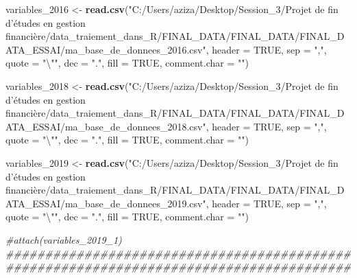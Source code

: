 \documentclass[
]{article}
\newenvironment{Shaded}{\begin{snugshade}}{\end{snugshade}}
\newcommand{\CharTok}[1]{\textcolor[rgb]{0.31,0.60,0.02}{#1}}
\newcommand{\CommentTok}[1]{\textcolor[rgb]{0.56,0.35,0.01}{\textit{#1}}}
\newcommand{\DataTypeTok}[1]{\textcolor[rgb]{0.13,0.29,0.53}{#1}}
\newcommand{\DecValTok}[1]{\textcolor[rgb]{0.00,0.00,0.81}{#1}}
\newcommand{\KeywordTok}[1]{\textcolor[rgb]{0.13,0.29,0.53}{\textbf{#1}}}
\newcommand{\NormalTok}[1]{#1}
\newcommand{\OtherTok}[1]{\textcolor[rgb]{0.56,0.35,0.01}{#1}}
\newcommand{\StringTok}[1]{\textcolor[rgb]{0.31,0.60,0.02}{#1}}
\begin{document}
\begin{Shaded}
\begin{Highlighting}[]
\NormalTok{variables_}\DecValTok{2016}\NormalTok{ <-}\StringTok{ }\KeywordTok{read.csv}\NormalTok{(}\StringTok{"C:/Users/aziza/Desktop/Session_3/Projet de fin d'études en gestion financière/data_traiement_dans_R/FINAL_DATA/FINAL_DATA/FINAL_DATA_ESSAI/ma_base_de_donnees_2016.csv"}\NormalTok{, }
                           \DataTypeTok{header =} \OtherTok{TRUE}\NormalTok{, }\DataTypeTok{sep =} \StringTok{","}\NormalTok{, }\DataTypeTok{quote =} \StringTok{"}\CharTok{\textbackslash{}"}\StringTok{"}\NormalTok{,}
                           \DataTypeTok{dec =} \StringTok{"."}\NormalTok{, }\DataTypeTok{fill =} \OtherTok{TRUE}\NormalTok{, }\DataTypeTok{comment.char =} \StringTok{""}\NormalTok{)}


\NormalTok{variables_}\DecValTok{2018}\NormalTok{ <-}\StringTok{ }\KeywordTok{read.csv}\NormalTok{(}\StringTok{"C:/Users/aziza/Desktop/Session_3/Projet de fin d'études en gestion financière/data_traiement_dans_R/FINAL_DATA/FINAL_DATA/FINAL_DATA_ESSAI/ma_base_de_donnees_2018.csv"}\NormalTok{, }
                           \DataTypeTok{header =} \OtherTok{TRUE}\NormalTok{, }\DataTypeTok{sep =} \StringTok{","}\NormalTok{, }\DataTypeTok{quote =} \StringTok{"}\CharTok{\textbackslash{}"}\StringTok{"}\NormalTok{,}
                           \DataTypeTok{dec =} \StringTok{"."}\NormalTok{, }\DataTypeTok{fill =} \OtherTok{TRUE}\NormalTok{, }\DataTypeTok{comment.char =} \StringTok{""}\NormalTok{)}


\NormalTok{variables_}\DecValTok{2019}\NormalTok{ <-}\StringTok{ }\KeywordTok{read.csv}\NormalTok{(}\StringTok{"C:/Users/aziza/Desktop/Session_3/Projet de fin d'études en gestion financière/data_traiement_dans_R/FINAL_DATA/FINAL_DATA/FINAL_DATA_ESSAI/ma_base_de_donnees_2019.csv"}\NormalTok{, }
                           \DataTypeTok{header =} \OtherTok{TRUE}\NormalTok{, }\DataTypeTok{sep =} \StringTok{","}\NormalTok{, }\DataTypeTok{quote =} \StringTok{"}\CharTok{\textbackslash{}"}\StringTok{"}\NormalTok{,}
                           \DataTypeTok{dec =} \StringTok{"."}\NormalTok{, }\DataTypeTok{fill =} \OtherTok{TRUE}\NormalTok{, }\DataTypeTok{comment.char =} \StringTok{""}\NormalTok{)}




\CommentTok{#attach(variables_2019_1)}
\CommentTok{########################################################################################}



\end{Highlighting}
\end{Shaded}
\end{document}
